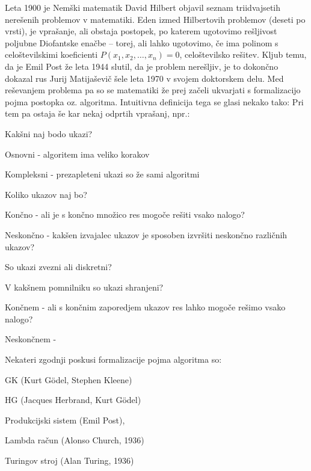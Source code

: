 \documentclass[10pt,a4paper,oneside]{book}
\begin{document}
Leta 1900 je Nemški matematik David Hilbert objavil seznam triidvajsetih nerešenih problemov v matematiki. Eden izmed Hilbertovih problemov (deseti po vrsti), je vprašanje, ali obstaja postopek, po katerem ugotovimo rešljivost poljubne Diofantske enačbe -- torej, ali lahko ugotovimo, če ima polinom s celoštevilskimi koeficienti $P(x_1, x_2, \dots, x_n)=0$, celoštevilsko rešitev.
Kljub temu, da je Emil Post že leta 1944 slutil, da je problem nerešljiv, je to dokončno dokazal rus Jurij Matijaševič šele leta 1970 v svojem doktorskem delu. Med reševanjem problema pa so se matematiki že prej začeli ukvarjati s formalizacijo pojma postopka oz. algoritma. Intuitivna definicija tega se glasi nekako tako:
Pri tem pa ostaja še kar nekaj odprtih vprašanj, npr.:
\begin{items}
\item Kakšni naj bodo ukazi? 
	\begin{items}
	\item Osnovni - algoritem ima veliko korakov
	\item Kompleksni - prezapleteni ukazi so že sami algoritmi
	\end{items}
\item Koliko ukazov naj bo?
	\begin{items}
	\item Končno - ali je s končno množico res mogoče rešiti vsako nalogo?
	\item Neskončno - kakšen izvajalec ukazov je sposoben izvršiti neskončno različnih ukazov?
	\end{items}
\item So ukazi zvezni ali diskretni?
\item V kakšnem pomnilniku so ukazi shranjeni?
	\begin{items}%
	\item Končnem - ali s končnim zaporedjem ukazov res lahko mogoče rešimo vsako nalogo?
	\item Neskončnem - %
	\end{items}
\end{items}
Nekateri zgodnji poskusi formalizacije pojma algoritma so:%
\begin{items}
    \item GK (Kurt Gödel, Stephen Kleene) 
    \item HG (Jacques Herbrand, Kurt Gödel)
    \item Produkcijski sistem (Emil Post), %
    \item Lambda račun (Alonso Church, 1936)
    \item Turingov stroj (Alan Turing, 1936)
\end{items}
\end{document}
